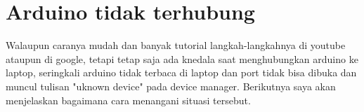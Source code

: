 \section{Arduino tidak terhubung}
Walaupun caranya mudah dan banyak tutorial langkah-langkahnya di youtube ataupun di google, tetapi tetap saja ada knedala saat menghubungkan arduino ke laptop, seringkali arduino tidak terbaca di laptop dan port tidak bisa dibuka dan muncul tulisan "uknown device" pada device manager.
Berikutnya saya akan menjelaskan bagaimana cara menangani situasi tersebut.